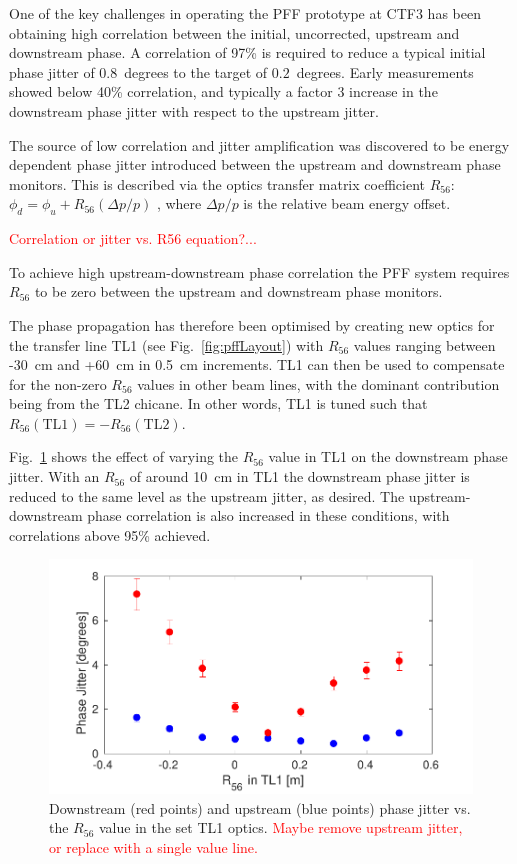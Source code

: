 \documentclass[%
 reprint,
 amsmath,amssymb,
 prl,
]{revtex4-1}
\begin{document}
One of the key challenges in operating the PFF prototype at CTF3 has been 
obtaining high correlation between the initial, uncorrected, upstream and 
downstream phase. A correlation of 97\% is required to reduce a typical initial 
phase jitter of \(0.8\)~degrees to the target of \(0.2\)~degrees. Early 
measurements showed below 40\% correlation, and typically a factor 3 increase in the downstream phase jitter with respect to the upstream jitter.

The source of low correlation and jitter amplification was discovered to be energy dependent phase 
jitter introduced between the upstream and downstream phase monitors. This is 
described via the optics transfer matrix coefficient \(R_{56}\):
\(\phi_d = \phi_u + R_{56}(\Delta p / p)\)
, where \(\Delta p / p\) is the relative beam energy offset.

\textcolor{red}{Correlation or jitter vs. R56 equation?...}

To achieve high upstream-downstream phase correlation the PFF system requires \(R_{56}\) to be zero between the upstream and 
downstream phase monitors.

The phase propagation has therefore been optimised by creating new optics for the transfer line TL1 (see Fig.~\ref{fig:pffLayout}) with \(R_{56}\) values ranging between -30~cm and +60~cm in 0.5~cm increments. TL1 can then be used to compensate for the non-zero \(R_{56}\) values in other beam lines, with the dominant contribution being from the TL2 chicane. In other words, TL1 is tuned such that \(R_{56}(\mathrm{TL1}) = -R_{56}(\mathrm{TL2})\).

Fig.~\ref{fig:r56Scan} shows the effect of varying the \(R_{56}\) value in TL1 on the downstream phase jitter. With an \(R_{56}\) of around 10~cm in TL1 the downstream phase jitter is reduced to the same level as the upstream jitter, as desired. The upstream-downstream phase correlation is also increased in these conditions, with correlations above 95\% achieved.

\begin{figure}
	\includegraphics[width=\columnwidth]{figs/r56Scan}%
	\caption{\label{fig:r56Scan}Downstream (red points) and upstream (blue 
	points) phase jitter vs. the \(R_{56}\) value in the set TL1 optics. 
	\textcolor{red}{Maybe remove 
	upstream jitter, or replace with a single value line.}}
\end{figure}
\end{document}
